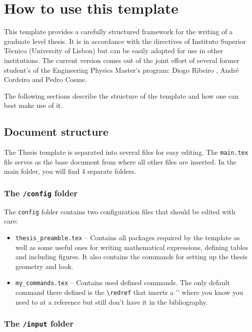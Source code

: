 \chapter{How to use this template}
\label{chapter:how_to_use_this_template}

This template provides a carefully structured framework for the writing of a graduate level thesis. It is in accordance with the directives of Instituto Superior Técnico (University of Lisbon) but can be easily adapted for use in other institutions. The current version comes out of the joint effort of several former student's of the Engineering Physics Master's program: Diogo Ribeiro , André Cordeiro and Pedro Cosme.

The following sections describe the structure of the template and how one can best make use of it.

\section{Document structure}

The Thesis template is separated into several files for easy editing. The \texttt{main.tex} file serves as the base document from where all other files are inserted. In the main folder, you will find 4 separate folders. 

\subsection{The \texttt{/config} folder }

The \texttt{config} folder contains two configuration files that should be edited with care:
%
\begin{itemize}
	\item \texttt{thesis\_preamble.tex} -- Contains all packages required by the template as well as some useful ones for writing mathematical expressions, defining tables and including figures. It also contains the commands for setting up the thesis geometry and look.
	
	\item \texttt{my\_commands.tex} -- Contains used defined commands. The only default command there defined is the \texttt{\textbackslash redref} that inserts a '\redref' where you know you need to at a reference but still don't have it in the bibliography.
\end{itemize}

\subsection{The \texttt{/input} folder }


